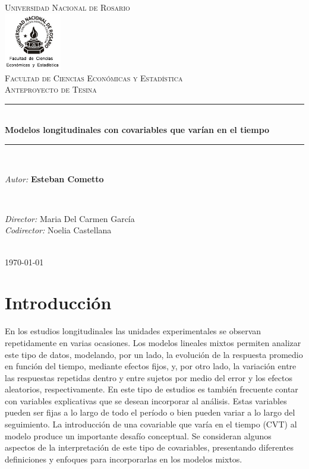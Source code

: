 \documentclass[12pt]{article}
\title{\thesistitle}
\author{\thesisauthorfirst\space\thesisauthorsecond}
\date{\thesisdate}
\def\thesistitle{Modelos longitudinales con covariables que varían en el tiempo}
\def\thesisauthorfirst{\textbf{Esteban Cometto}}
\def\thesissupervisorfirst{Maria Del Carmen García}
\def\thesissupervisorsecond{Noelia Castellana}
\def\thesisdate{\today}
\def\cvt{covariable que varía en el tiempo}
\begin{document}
\begin{titlepage}
    \newcommand{\HRule}{\rule{\linewidth}{0.5mm}}
	\center
	\textsc{\Large Universidad Nacional de Rosario}\\[.7cm]
	\includegraphics[width=25mm]{img/fceye-unr.png}\\[.5cm]
	\textsc{Facultad de Ciencias Económicas y Estadística}\\[0.5cm]
	\textsc{Anteproyecto de Tesina}
	
	\HRule \\[0.4cm]
	{ \huge \bfseries \thesistitle}\\[0.1cm]
	\HRule \\[.5cm]
	
	\begin{minipage}{0.6\textwidth}
	\large
	\emph{Autor:}	\thesisauthorfirst
	\end{minipage}
	\\[.6cm]
	\begin{minipage}{0.6\textwidth}
	\emph{Director:} 	\thesissupervisorfirst \\[.2cm]
	\emph{Codirector:} 	\thesissupervisorsecond
	\end{minipage}
	\\[4cm]
	\vfill
	{\large \thesisdate}\\
	\clearpage
\end{titlepage}

\newpage
\tableofcontents

\newpage
\section{Introducción}

En los estudios longitudinales las unidades experimentales se observan repetidamente en varias ocasiones. Los modelos
lineales mixtos permiten analizar este tipo de datos, modelando, por un lado, la evolución de la respuesta promedio en
función del tiempo, mediante efectos fijos, y, por otro lado, la variación entre las respuestas repetidas dentro y entre
sujetos por medio del error y los efectos aleatorios, respectivamente. En este tipo de estudios es también frecuente contar
con variables explicativas que se desean incorporar al análisis. Estas variables pueden ser fijas a lo largo de todo el
período o bien pueden variar a lo largo del seguimiento. La introducción de una \cvt{} (CVT) al
modelo produce un importante desafío conceptual. Se consideran algunos aspectos de la interpretación de este tipo de
covariables, presentando diferentes definiciones y enfoques para incorporarlas en los modelos mixtos.
\end{document}
